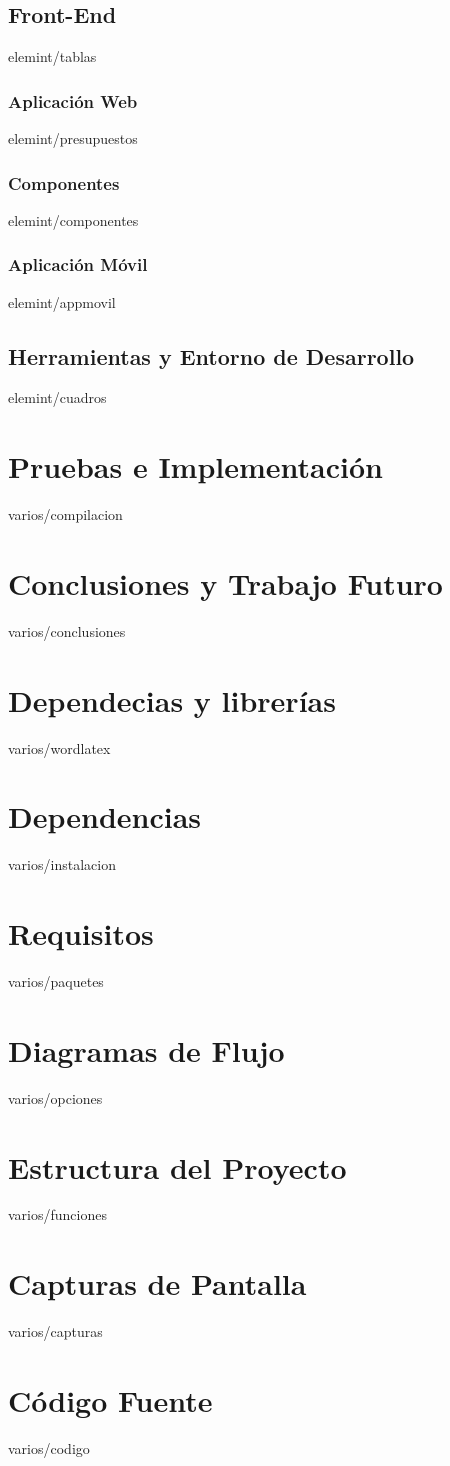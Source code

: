 \documentclass[epsbased,copyright,final,printable,covers,extendedindex,firstnumbered,tfg,gnuplot]{tfgtfmthesisuam}
\begin{document}
  \section{Front-End\label{SEC:TABLAS}}{elemint/tablas}
    \subsection{Aplicación Web\label{SS:PRESUPUESTOS}}{elemint/presupuestos}
    \subsection{Componentes\label{SS:COMPONENTES}}{elemint/componentes}
    \subsection{Aplicación Móvil\label{SS:APPMOVIL}}{elemint/appmovil}
  \section{Herramientas y Entorno de Desarrollo\label{SEC:CUADROS}}{elemint/cuadros}

\chapter{Pruebas e Implementación\label{CAP:COMPILACION}}{varios/compilacion}

\chapter{Conclusiones y Trabajo Futuro\label{CAP:CONCLUSIONES}}{varios/conclusiones}

\appendix

\chapter{Dependecias y librerías\label{CAP:WORDLATEX}}{varios/wordlatex}
\chapter{Dependencias\label{CAP:INSTALACION}}{varios/instalacion}
\chapter{Requisitos\label{CAP:PAQUETES}}{varios/paquetes}
\chapter{Diagramas de Flujo\label{CAP:OPCIONES}}{varios/opciones}
\chapter{Estructura del Proyecto\label{CAP:FUNCENT}}{varios/funciones}
\chapter{Capturas de Pantalla\label{CAP:CAPTURAS}}{varios/capturas}
\chapter{Código Fuente\label{CAP:CODIGO}}{varios/codigo}
\end{document}

